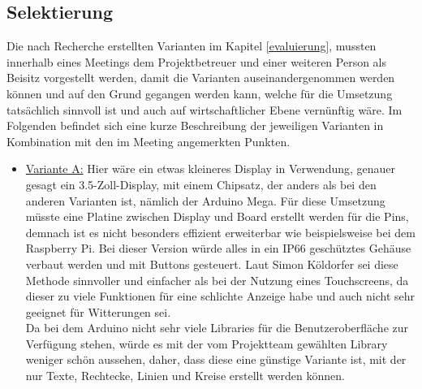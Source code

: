 \newpage
\subsection{Selektierung} \label{selektierung}
Die nach Recherche erstellten Varianten im Kapitel \ref{evaluierung}, mussten innerhalb eines Meetings dem Projektbetreuer und einer weiteren Person als Beisitz vorgestellt werden, damit die Varianten auseinandergenommen werden können und auf den Grund gegangen werden kann, welche für die Umsetzung tatsächlich sinnvoll ist und auch auf wirtschaftlicher Ebene vernünftig wäre. Im Folgenden befindet sich eine kurze Beschreibung der jeweiligen Varianten in Kombination mit den im Meeting angemerkten Punkten.

\begin{itemize}
	\item \underline{Variante A:} Hier wäre ein etwas kleineres Display in Verwendung, genauer gesagt ein 3.5-Zoll-Display, mit einem Chipsatz, der anders als bei den anderen Varianten ist, nämlich der Arduino Mega. Für diese Umsetzung müsste eine Platine zwischen Display und Board erstellt werden für die Pins, demnach ist es nicht besonders effizient erweiterbar wie beispielsweise bei dem Raspberry Pi. Bei dieser Version würde alles in ein IP66 geschütztes Gehäuse verbaut werden und mit Buttons gesteuert. Laut Simon Köldorfer sei diese Methode sinnvoller und einfacher als bei der Nutzung eines Touchscreens, da dieser zu viele Funktionen für eine schlichte Anzeige habe und auch nicht sehr geeignet für Witterungen sei. \\
	Da bei dem Arduino nicht sehr viele Libraries für die Benutzeroberfläche zur Verfügung stehen, würde es mit der vom Projektteam gewählten Library weniger schön aussehen, daher, dass diese eine günstige Variante ist, mit der nur Texte, Rechtecke, Linien und Kreise erstellt werden können.
	

\end{itemize}
